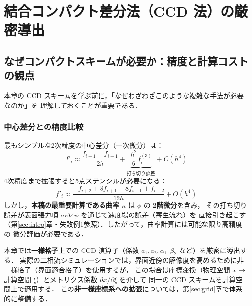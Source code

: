 \section{結合コンパクト差分法（CCD 法）の厳密導出}
\label{sec:CCD}

\subsection{なぜコンパクトスキームが必要か：精度と計算コストの観点}
\label{sec:ccd_motivation}

本章の CCD スキームを学ぶ前に，「なぜわざわざこのような複雑な手法が必要なのか」を
理解しておくことが重要である．

\subsubsection{中心差分との精度比較}

最もシンプルな2次精度の中心差分（一次微分）は：
\begin{equation}
  f'_i \approx \frac{f_{i+1} - f_{i-1}}{2h} + \underbrace{\frac{h^2}{6}f^{(3)}_i}_{\text{打ち切り誤差}}
  + O(h^4)
  \label{eq:central2nd}
\end{equation}
4次精度まで拡張すると5点ステンシルが必要になる：
\begin{equation}
  f'_i \approx \frac{-f_{i+2}+8f_{i+1}-8f_{i-1}+f_{i-2}}{12h} + O(h^4)
  \label{eq:central4th}
\end{equation}
しかし，\textbf{本稿の最重要計算である曲率 $\kappa$} は $\phi$ の \textbf{2階微分}を含み，
その打ち切り誤差が表面張力項 $\sigma\kappa\nabla\psi$ を通じて速度場の誤差（寄生流れ）を
直接引き起こす（第\ref{sec:intro}章・失敗例1参照）．したがって，曲率計算には可能な限り高精度の
微分評価が必要である．

本章では\textbf{一様格子}上での CCD 演算子（係数 $a_1, a_2, \alpha_1, \beta_2$ など）を厳密に導出する．
実際の二相流シミュレーションでは，界面近傍の解像度を高めるために非一様格子（界面適合格子）を使用するが，
この場合は座標変換（物理空間 $x$ → 計算空間 $\xi$）とメトリクス係数 $\partial x/\partial\xi$ を介して
同一の CCD スキームを計算空間上で適用する．
この\textbf{非一様座標系への拡張}については，第\ref{sec:grid}章で体系的に整備する．

